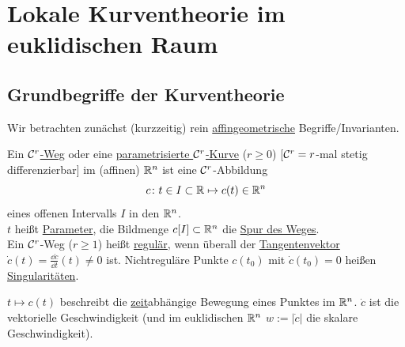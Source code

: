 \chapter{Lokale Kurventheorie im euklidischen Raum}
\section{Grundbegriffe der Kurventheorie}
Wir betrachten zunächst (kurzzeitig) rein \uline{affingeometrische} Begriffe/Invarianten.
\begin{definition}
 Ein \uline{\(\mathcal{C}^r\)-Weg} oder eine \uline{parametrisierte \(\mathcal{C}^r\)-Kurve} (\(r\ge 0\)) [\(\mathcal{C}^r = r\)-mal stetig differenzierbar] im (affinen) \(\mathbb{R}^n\) ist eine \(\mathcal{C}^r\)-Abbildung 
\[
 c\colon t\in I \subset \mathbb{R} \mapsto c(t)\in \mathbb{R}^n
\]
eines offenen Intervalls \(I\) in den \(\mathbb{R}^n\). \\
\(t\) heißt \uline{Parameter}, die Bildmenge \(c[I] \subset \mathbb{R}^n\) die \uline{Spur des Weges}. \\
Ein \(\mathcal{C}^r\)-Weg (\(r\ge 1\)) heißt \uline{regulär}, wenn überall der \uline{Tangentenvektor} \(\dot c(t) = \frac{\dd c}{\dd t}(t) \ne 0\) ist. Nichtreguläre Punkte \(c(t_0)\) mit \(\dot c(t_0)=0\) heißen \uline{Singularitäten}.
\end{definition}
\begin{kin}
\(t \mapsto c(t)\) beschreibt die \uline{zeit}abhängige Bewegung eines Punktes im \(\mathbb{R}^n\).
\(\dot c\) ist die vektorielle Geschwindigkeit (und im euklidischen \(\mathbb{R}^n\) \(w:= | \dot c|\) die skalare Geschwindigkeit).
\end{kin}
